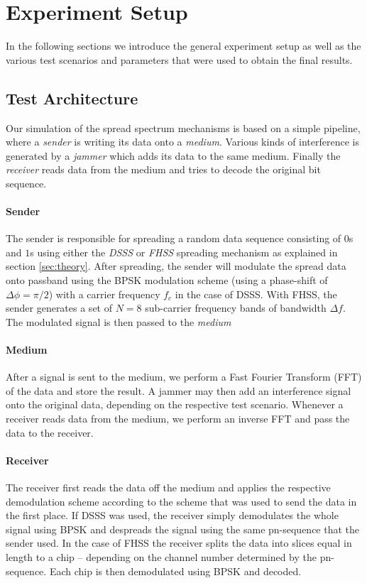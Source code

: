 \section{Experiment Setup}

	In the following sections we introduce the general experiment setup as well as the various test scenarios and parameters that were used to obtain the final results.
	
	\subsection{Test Architecture}
	Our simulation of the spread spectrum mechanisms is based on a simple pipeline, where a \emph{sender} is writing its data onto a \emph{medium}. Various kinds of interference is generated by a \emph{jammer} which adds its data to the same medium. Finally the \emph{receiver} reads data from the medium and tries to decode the original bit sequence.
	
	\paragraph{Sender}
	The sender is responsible for spreading a random data sequence consisting of $0$s and $1$s using either the \emph{DSSS} or \emph{FHSS} spreading mechanism as explained in section \ref{sec:theory}. After spreading, the sender will modulate the spread data onto passband using the BPSK modulation scheme (using a phase-shift of $\Delta \phi = \pi / 2$) with a carrier frequency $f_c$ in the case of DSSS. With FHSS, the sender generates a set of $N=8$ sub-carrier frequency bands of bandwidth $\Delta f$. The modulated signal is then passed to the \emph{medium}
	
	\paragraph{Medium} 
	After a signal is sent to the medium, we perform a Fast Fourier Transform (FFT) of the data and store the result. A jammer may then add an interference signal onto the original data, depending on the respective test scenario. Whenever a receiver reads data from the medium, we perform an inverse FFT and pass the data to the receiver.
	
	\paragraph{Receiver}
	The receiver first reads the data off the medium and applies the respective demodulation scheme according to the scheme that was used to send the data in the first place. If DSSS was used, the receiver simply demodulates the whole signal using BPSK and despreads the signal using the same pn-sequence that the sender used. In the case of FHSS the receiver splits the data into slices equal in length to a chip -- depending on the channel number determined by the pn-sequence. Each chip is then demodulated using BPSK and decoded. 
		
